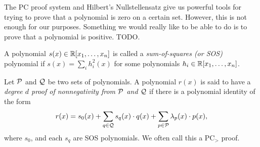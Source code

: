 The PC proof system and Hilbert's Nullstellensatz give us powerful tools for trying to prove that a polynomial is zero on a certain set. However, this is not enough for our purposes. Something we would really like to be able to do is to prove that a polynomial is positive. TODO.
\begin{definition}
A polynomial $s(x) \in \mathbb R[x_1,\dots,x_n]$ is called a \emph{sum-of-squares (or SOS)} polynomial if $s(x) = \sum_i h_i^2(x)$ for some polynomials $h_i \in \mathbb R[x_1,\dots,x_n]$.
\end{definition}
\begin{definition}
Let $\mathcal P$ and $\mathcal Q$ be two sets of polynomials. A polynomial $r(x)$ is said to have a \emph{degree $d$ proof of nonnegativity from $\mathcal P$ and $\mathcal Q$} if there is a polynomial identity of the form
\[r(x) = s_0(x) + \sum_{q \in \mathcal Q} s_q(x) \cdot q(x) + \sum_{p \in \mathcal P} \lambda_p(x) \cdot p(x),\]
where $s_0$, and each $s_q$ are SOS polynomials. We often call this a PC$_>$ proof. 
\end{definition}